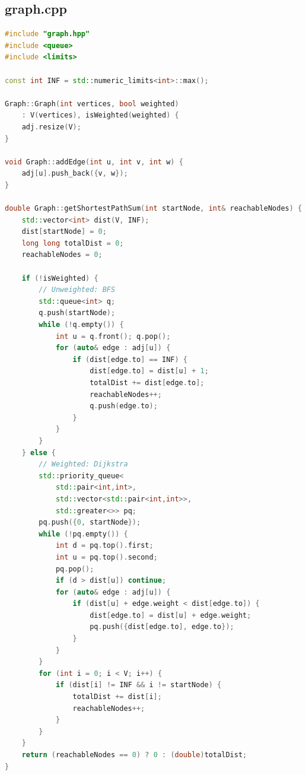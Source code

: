 \documentclass[12pt,a4paper]{article}
\begin{document}
\subsection*{graph.cpp}
\begin{lstlisting}[language=C++, caption={graph.cpp --- BFS and Dijkstra implementations}]
#include "graph.hpp"
#include <queue>
#include <limits>

const int INF = std::numeric_limits<int>::max();

Graph::Graph(int vertices, bool weighted)
    : V(vertices), isWeighted(weighted) {
    adj.resize(V);
}

void Graph::addEdge(int u, int v, int w) {
    adj[u].push_back({v, w});
}

double Graph::getShortestPathSum(int startNode, int& reachableNodes) {
    std::vector<int> dist(V, INF);
    dist[startNode] = 0;
    long long totalDist = 0;
    reachableNodes = 0;

    if (!isWeighted) {
        // Unweighted: BFS
        std::queue<int> q;
        q.push(startNode);
        while (!q.empty()) {
            int u = q.front(); q.pop();
            for (auto& edge : adj[u]) {
                if (dist[edge.to] == INF) {
                    dist[edge.to] = dist[u] + 1;
                    totalDist += dist[edge.to];
                    reachableNodes++;
                    q.push(edge.to);
                }
            }
        }
    } else {
        // Weighted: Dijkstra
        std::priority_queue<
            std::pair<int,int>,
            std::vector<std::pair<int,int>>,
            std::greater<>> pq;
        pq.push({0, startNode});
        while (!pq.empty()) {
            int d = pq.top().first;
            int u = pq.top().second;
            pq.pop();
            if (d > dist[u]) continue;
            for (auto& edge : adj[u]) {
                if (dist[u] + edge.weight < dist[edge.to]) {
                    dist[edge.to] = dist[u] + edge.weight;
                    pq.push({dist[edge.to], edge.to});
                }
            }
        }
        for (int i = 0; i < V; i++) {
            if (dist[i] != INF && i != startNode) {
                totalDist += dist[i];
                reachableNodes++;
            }
        }
    }
    return (reachableNodes == 0) ? 0 : (double)totalDist;
}
\end{lstlisting}
\end{document}
